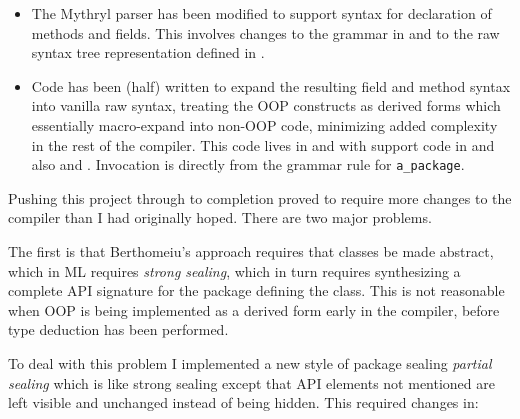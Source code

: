 \begin{itemize}

\item The Mythryl parser has been modified to support syntax for 
declaration of methods and fields.  This involves changes to the 
grammar in  
and to the raw syntax tree representation defined in 
.

\item Code has been (half) written to expand the resulting field 
and method syntax into vanilla raw syntax, treating the OOP 
constructs as derived forms which essentially macro-expand into 
non-OOP code, minimizing added complexity in the rest of the compiler. 
This code lives in  
 and 
with support code in 
 and also 
 and 
.
Invocation is directly from the grammar rule for {\tt a\_package}.

\end{itemize}

Pushing this project through to completion proved to require more 
changes to the compiler than I had originally hoped.  There are 
two major problems.

The first is that Berthomeiu's approach requires that classes 
be made abstract, which in ML requires {\it strong sealing}, which 
in turn requires synthesizing a complete {\sc API} signature 
for the package defining the class.  This is not reasonable 
when OOP is being implemented as a derived form early in the 
compiler, before type deduction has been performed.

To deal with this problem I implemented a new style of package 
sealing {\it partial sealing} which is like strong sealing 
except that API elements not mentioned are left visible and 
unchanged instead of being hidden. This required changes in:

